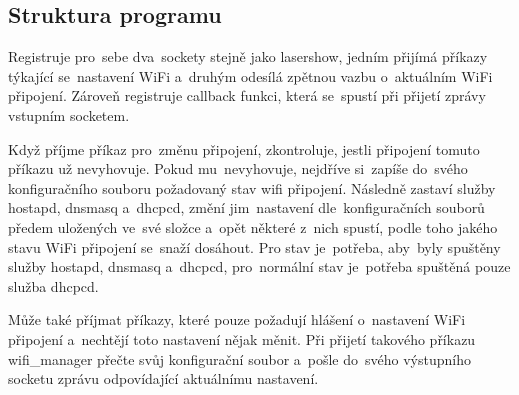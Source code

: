 \subsection{Struktura programu}

Registruje pro~sebe dva~sockety stejně jako lasershow, jedním přijímá příkazy týkající se~nastavení WiFi a~druhým odesílá zpětnou vazbu o~aktuálním WiFi připojení. Zároveň registruje callback funkci, která se~spustí při přijetí zprávy vstupním socketem.

Když příjme příkaz pro~změnu připojení, zkontroluje, jestli připojení tomuto příkazu už nevyhovuje. Pokud mu~nevyhovuje, nejdříve si~zapíše do~svého konfiguračního souboru požadovaný stav wifi připojení. Následně zastaví služby hostapd, dnsmasq a~dhcpcd, změní jim~nastavení dle~konfiguračních souborů předem uložených ve~své složce a~opět některé z~nich spustí, podle toho jakého stavu WiFi připojení se~snaží dosáhout.
Pro  stav je~potřeba, aby~byly spuštěny služby hostapd, dnsmasq a~dhcpcd, pro~normální  stav je~potřeba spuštěná pouze služba dhcpcd.

Může také příjmat příkazy, které pouze požadují hlášení o~nastavení WiFi připojení a~nechtějí toto nastavení nějak měnit. Při přijetí takového příkazu wifi\_manager přečte svůj konfigurační soubor a~pošle do~svého výstupního socketu zprávu odpovídající aktuálnímu nastavení.
